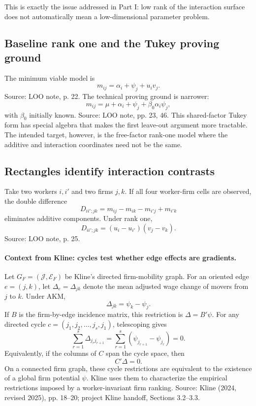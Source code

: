 \documentclass[11pt]{article}
\begin{document}
This is exactly the issue addressed in Part I: low rank of the interaction surface
does not automatically mean a low-dimensional parameter problem.

\subsection{Baseline rank one and the Tukey proving ground}

The minimum viable model is
\[
m_{ij}=\alpha_i+\psi_j+u_i v_j.
\]
Source: LOO note, p. 22. The technical proving ground is narrower:
\[
m_{ij}=\mu+\alpha_i+\psi_j+\beta_0\alpha_i\psi_j,
\]
with \(\beta_0\) initially known. Source: LOO note, pp. 23, 46. This
shared-factor Tukey form has special algebra that makes the first leave-out
argument more tractable. The intended target, however, is the free-factor
rank-one model where the additive and interaction coordinates need not be the
same.

\subsection{Rectangles identify interaction contrasts}

Take two workers \(i,i'\) and two firms \(j,k\). If all four worker-firm cells
are observed, the double difference
\[
D_{ii';jk}
=
m_{ij}-m_{ik}-m_{i'j}+m_{i'k}
\]
eliminates additive components. Under rank one,
\[
D_{ii';jk}
=
(u_i-u_{i'})(v_j-v_k).
\]
Source: LOO note, p. 25.

\paragraph{Context from Kline: cycles test whether edge effects are gradients.}
Let \(G_F=(\mathcal J,\mathcal E_F)\) be Kline's directed firm-mobility graph.
For an oriented edge \(e=(j,k)\), let \(\Delta_e=\Delta_{jk}\) denote the mean
adjusted wage change of movers from \(j\) to \(k\).  Under AKM,
\[
\Delta_{jk}=\psi_k-\psi_j.
\tag{Kline-gradient}
\]
If \(B\) is the firm-by-edge incidence matrix, this restriction is
\(\Delta=B'\psi\).  For any directed cycle
\(c=(j_1,j_2,\ldots,j_s,j_1)\), telescoping gives
\[
\sum_{r=1}^s\Delta_{j_rj_{r+1}}
=
\sum_{r=1}^s(\psi_{j_{r+1}}-\psi_{j_r})=0.
\tag{Kline-cycle}
\]
Equivalently, if the columns of \(C\) span the cycle space, then
\[
C'\Delta=0.
\]
On a connected firm graph, these cycle restrictions are equivalent to the
existence of a global firm potential \(\psi\).  Kline uses them to characterize
the empirical restrictions imposed by a worker-invariant firm ranking.  Source:
Kline (2024, revised 2025), pp. 18--20; project Kline handoff, Sections 3.2--3.3.
\end{document}
